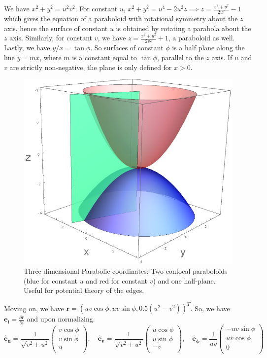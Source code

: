 \documentclass[a4paper]{article}
\begin{document}
\begin{ans}
We have $x^2+y^2=u^2v^2$. For constant $u$, $x^2+y^2=u^4-2u^2z\implies z=\frac{x^2+y^2}{2u^2}-1$ which gives the equation of a paraboloid with rotational symmetry about the $z$ axis, hence the surface of constant $u$ is obtained by rotating a parabola about the $z$ axis. Similarly, for constant $v$, we have $z=\frac{x^2+y^2}{2v^2}+1$, a paraboloid as well. Lastly, we have $y/x=\tan\phi$. So surfaces of constant $\phi$ is a half plane along the line $y=mx$, where $m$ is a constant equal to $\tan\phi$, parallel to the $z$ axis. If $u$ and $v$ are strictly non-negative, the plane is only defined for $x>0$.
\begin{figure}[H]
    \centering
    \includegraphics[scale=0.45]{MEx1Q7.png}
    \caption{Three-dimensional Parabolic coordinates: Two confocal paraboloids (blue for constant $u$ and red for constant $v$) and one half-plane. Useful for potential theory of the edges.}
\end{figure}
Moving on, we have $\mathbf{r}=(uv\cos\phi,uv\sin\phi,0.5(u^2-v^2))^T$. So, we have $\mathbf{e_i}=\frac{\partial\mathbf{r}}{\partial i}$ and upon normalizing. 
$$\mathbf{\hat{e}_u}=\frac{1}{\sqrt{v^2+u^2}}\begin{pmatrix}v\cos\phi\\v\sin\phi\\u\\\end{pmatrix}, \quad\mathbf{\hat{e}_v}=\frac{1}{\sqrt{v^2+u^2}}\begin{pmatrix}u\cos\phi\\u\sin\phi\\-v\\\end{pmatrix},\quad\mathbf{\hat{e}_\phi}=\frac{1}{uv}\begin{pmatrix}-uv\sin\phi\\uv\cos\phi\\0\\\end{pmatrix}$$

\end{ans}
\end{document}
